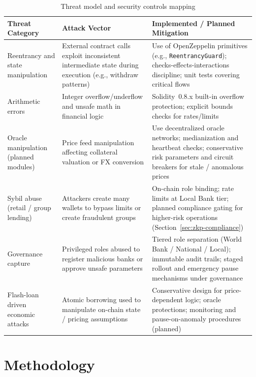 \documentclass[12pt,a4paper]{report}
\begin{document}
\begin{table}[H]
\centering
\caption{Threat model and security controls mapping}
\label{tab:threat-model}
\begin{tabular}{p{3.2cm}p{6.2cm}p{6.2cm}}
\hline
\textbf{Threat Category} & \textbf{Attack Vector} & \textbf{Implemented / Planned Mitigation} \\
\hline
Reentrancy and state manipulation & External contract calls exploit inconsistent intermediate state during execution (e.g., withdraw patterns) & Use of OpenZeppelin primitives (e.g., \texttt{ReentrancyGuard}); checks-effects-interactions discipline; unit tests covering critical flows \\
\hline
Arithmetic errors & Integer overflow/underflow and unsafe math in financial logic & Solidity~0.8.x built-in overflow protection; explicit bounds checks for rates/limits \\
\hline
Oracle manipulation (planned modules) & Price feed manipulation affecting collateral valuation or FX conversion & Use decentralized oracle networks; medianization and heartbeat checks; conservative risk parameters and circuit breakers for stale / anomalous prices \\
\hline
Sybil abuse (retail / group lending) & Attackers create many wallets to bypass limits or create fraudulent groups & On-chain role binding; rate limits at Local Bank tier; planned compliance gating for higher-risk operations (Section~\ref{sec:zkp-compliance}) \\
\hline
Governance capture & Privileged roles abused to register malicious banks or approve unsafe parameters & Tiered role separation (World Bank / National / Local); immutable audit trails; staged rollout and emergency pause mechanisms under governance \\
\hline
Flash-loan driven economic attacks & Atomic borrowing used to manipulate on-chain state / pricing assumptions & Conservative design for price-dependent logic; oracle protections; monitoring and pause-on-anomaly procedures (planned) \\
\hline
\end{tabular}
\end{table}


\chapter{Methodology}
\end{document}
